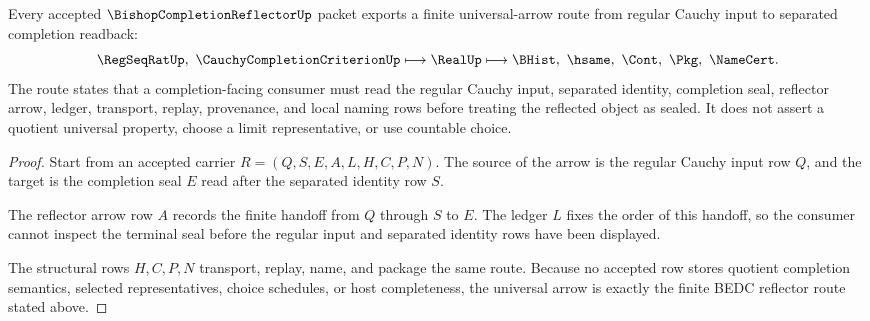 \begin{theorem}\label{thm:bishop-completion-reflector-universal-arrow}
Every accepted $\BishopCompletionReflectorUp$ packet exports a finite universal-arrow route from regular Cauchy input to separated completion readback:
$$
\RegSeqRatUp,\ \CauchyCompletionCriterionUp
\longmapsto
\RealUp
\longmapsto
\BHist,\ \hsame,\ \Cont,\ \Pkg,\ \NameCert .
$$
The route states that a completion-facing consumer must read the regular Cauchy input, separated identity, completion seal, reflector arrow, ledger, transport, replay, provenance, and local naming rows before treating the reflected object as sealed. It does not assert a quotient universal property, choose a limit representative, or use countable choice.
\end{theorem}
\begin{proof}
Start from an accepted carrier $R=(Q,S,E,A,L,H,C,P,N)$. The source of the arrow is the regular Cauchy input row $Q$, and the target is the completion seal $E$ read after the separated identity row $S$.

The reflector arrow row $A$ records the finite handoff from $Q$ through $S$ to $E$. The ledger $L$ fixes the order of this handoff, so the consumer cannot inspect the terminal seal before the regular input and separated identity rows have been displayed.

The structural rows $H,C,P,N$ transport, replay, name, and package the same route. Because no accepted row stores quotient completion semantics, selected representatives, choice schedules, or host completeness, the universal arrow is exactly the finite BEDC reflector route stated above.
\end{proof}


\begin{closurestatus}{\BishopCompletionReflectorUp}
  \theoryclosure{\seedClosure}
  \formalstatus{\unformalizedV}
\end{closurestatus}
